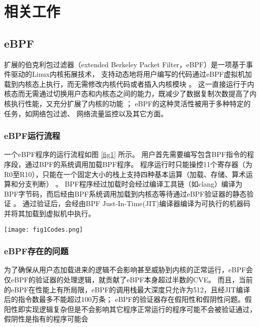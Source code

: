 \section{相关工作}
\label{section:relatedWork}
\subsection{eBPF}
扩展的伯克利包过滤器（extended Berkeley Packet Filter，eBPF）是一项基于事件驱动的Linux内核拓展技术，\nolinebreak
支持动态地将用户编写的代码通过eBPF虚拟机加载到内核态上执行，而无需修改内核代码或者插入内核模块\nolinebreak
\cite{sunFindingCorrectnessBugs2024, YIHeCrossContainer}。\nolinebreak
这一直接运行于内核态而无需通过切换用户态和内核态之间的能力，既减少了数据复制次数提高了内核执行性能，又充分扩展了内核的功能\nolinebreak
\cite{YIHeCrossContainer, ZhangZiJunLinuxXiTonge}；\nolinebreak
eBPF的这种灵活性被用于多种特定的任务\cite{HaoValidating}，如网络包过滤\cite{10.1145/3371038, TCPdump}、\nolinebreak
网络流量监控\cite{9110434}以及其它方面\cite{280870, 258973}。\nolinebreak

\subsubsection{eBPF运行流程}
一个eBPF程序的运行流程如图 \ref{fig1} 所示。\nolinebreak
用户首先需要编写包含BPF指令的程序段，通过BPF的系统调用加载BPF程序。\nolinebreak
程序运行时只能操控11个寄存器（为R0至R10），只能在一个固定大小的栈上支持四种基本运算（加载、存储、算术运算和分支判断）\nolinebreak
\cite{HaoValidating}。\nolinebreak
BPF程序经过加载时会经过编译工具链（如clang）编译为BPF字节码，而后经由BPF系统调用加载到内核态等待通过eBPF验证器的静态验证\nolinebreak
\cite{zhengBpftimeUserspaceEBPF2023}。\nolinebreak
通过验证后，会经由BPF Just-In-Time(JIT)编译器编译为可执行的机器码并将其加载到虚拟机中执行。

\begin{center}
\begin{figure*}[t] 
    \texttt{[image: fig1Codes.png]}
    \caption{wasm对应的人类可读表示wat示意图}
    \label{fig1}
\end{figure*}
\end{center}

\subsubsection{eBPF存在的问题}
为了确保从用户态加载进来的逻辑不会影响甚至威胁到内核的正常运行，eBPF会
仅eBPF的验证器的处理逻辑，就贡献了eBPF本身超过半数的CVE\cite{hive}。\nolinebreak
而且，当前的eBPF在性能上有所局限，eBPF的调用栈最大深度只允许为512，且经JIT编译后的指令数最多不能超过100万条；\nolinebreak
eBPF的验证器存在假阳性\cite{hive}和假阴性问题。假阳性即实现逻辑复杂但是不会影响其它程序正常运行的程序可能不会被验证通过，假阴性是指有的程序可能会

